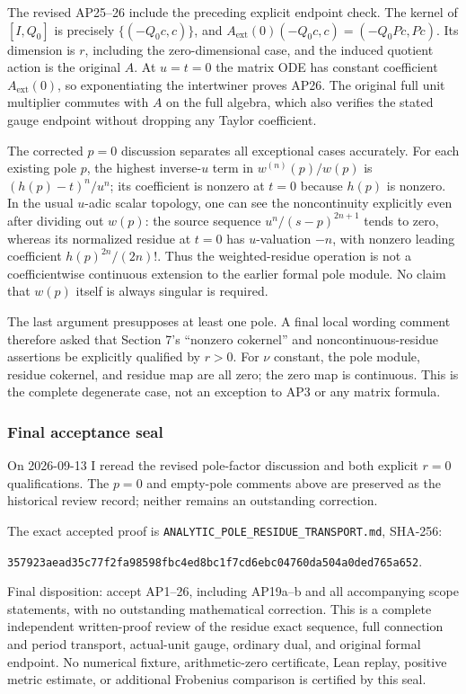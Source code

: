 The revised AP25--26 include the preceding explicit endpoint check. The kernel of \([I,Q_0]\) is precisely \(\{(-Q_0 c,c)\}\), and \(A_{\mathrm{ext}}(0)(-Q_0 c,c)=(-Q_0 Pc,Pc)\). Its dimension is \(r\), including the zero-dimensional case, and the induced quotient action is the original \(A\). At \(u=t=0\) the matrix ODE has constant coefficient \(A_{\mathrm{ext}}(0)\), so exponentiating the intertwiner proves AP26. The original full unit multiplier commutes with \(A\) on the full algebra, which also verifies the stated gauge endpoint without dropping any Taylor coefficient.

The corrected \(p=0\) discussion separates all exceptional cases accurately. For each existing pole \(p\), the highest inverse-\(u\) term in \(w^{(n)}(p)/w(p)\) is \((h(p)-t)^n/u^n\); its coefficient is nonzero at \(t=0\) because \(h(p)\) is nonzero. In the usual \(u\)-adic scalar topology, one can see the noncontinuity explicitly even after dividing out \(w(p)\): the source sequence \(u^n/(s-p)^{2n+1}\) tends to zero, whereas its normalized residue at \(t=0\) has \(u\)-valuation \(-n\), with nonzero leading coefficient \(h(p)^{2n}/(2n)!\). Thus the weighted-residue operation is not a coefficientwise continuous extension to the earlier formal pole module. No claim that \(w(p)\) itself is always singular is required.

The last argument presupposes at least one pole. A final local wording comment therefore asked that Section 7's ``nonzero cokernel'' and noncontinuous-residue assertions be explicitly qualified by \(r>0\). For \(\nu\) constant, the pole module, residue cokernel, and residue map are all zero; the zero map is continuous. This is the complete degenerate case, not an exception to AP3 or any matrix formula.

\subsubsection{Final acceptance seal}\label{endpoint-analytic_pole_review--final-acceptance-seal}

On 2026-09-13 I reread the revised pole-factor discussion and both explicit \(r=0\) qualifications. The \(p=0\) and empty-pole comments above are preserved as the historical review record; neither remains an outstanding correction.

The exact accepted proof is \nolinkurl{ANALYTIC_POLE_RESIDUE_TRANSPORT.md}, SHA-256:

\nolinkurl{357923aead35c77f2fa98598fbc4ed8bc1f7cd6ebc04760da504a0ded765a652}.

Final disposition: accept AP1--26, including AP19a--b and all accompanying scope statements, with no outstanding mathematical correction. This is a complete independent written-proof review of the residue exact sequence, full connection and period transport, actual-unit gauge, ordinary dual, and original formal endpoint. No numerical fixture, arithmetic-zero certificate, Lean replay, positive metric estimate, or additional Frobenius comparison is certified by this seal.
